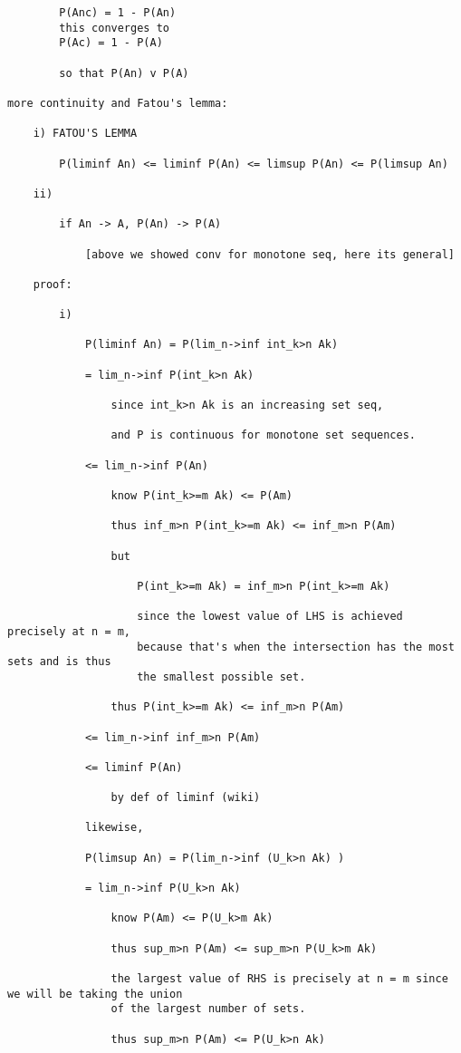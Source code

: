 \documentclass{article}
\begin{document}
\begin{flushleft}
\begin{verbatim}
		P(Anc) = 1 - P(An) 
		this converges to
		P(Ac) = 1 - P(A)
		
		so that P(An) v P(A)
		
more continuity and Fatou's lemma:

	i) FATOU'S LEMMA
	
		P(liminf An) <= liminf P(An) <= limsup P(An) <= P(limsup An)
		
	ii) 
	
		if An -> A, P(An) -> P(A)   
		
			[above we showed conv for monotone seq, here its general]
	
	proof:
	
		i) 
			
			P(liminf An) = P(lim_n->inf int_k>n Ak)
			
			= lim_n->inf P(int_k>n Ak)
			
				since int_k>n Ak is an increasing set seq,
				
				and P is continuous for monotone set sequences. 
				
			<= lim_n->inf P(An)
				
				know P(int_k>=m Ak) <= P(Am)
				
				thus inf_m>n P(int_k>=m Ak) <= inf_m>n P(Am)
				
				but 
				
					P(int_k>=m Ak) = inf_m>n P(int_k>=m Ak)
					
					since the lowest value of LHS is achieved precisely at n = m,
					because that's when the intersection has the most sets and is thus
					the smallest possible set. 
					
				thus P(int_k>=m Ak) <= inf_m>n P(Am)
				
			<= lim_n->inf inf_m>n P(Am)
				
			<= liminf P(An)
			
				by def of liminf (wiki)
					
			likewise,
			
			P(limsup An) = P(lim_n->inf (U_k>n Ak) )
			
			= lim_n->inf P(U_k>n Ak)
			
				know P(Am) <= P(U_k>m Ak)
				
				thus sup_m>n P(Am) <= sup_m>n P(U_k>m Ak)
				
				the largest value of RHS is precisely at n = m since we will be taking the union
				of the largest number of sets. 
				
				thus sup_m>n P(Am) <= P(U_k>n Ak)
				

\end{verbatim}
\end{flushleft}
\end{document}
